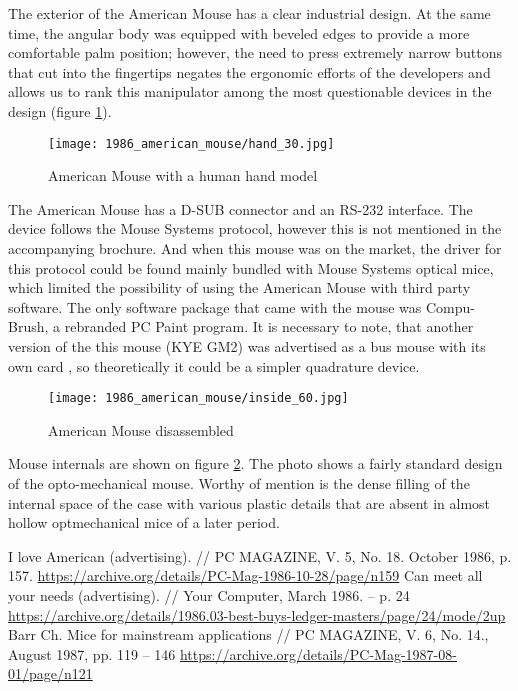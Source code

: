 \documentclass[11pt, a4paper]{article}
\begin{document}
The exterior of the American Mouse has a clear industrial design. At the same time, the angular body was equipped with beveled edges to provide a more comfortable palm position; however, the need to press extremely narrow buttons that cut into the fingertips negates the ergonomic efforts of the developers and allows us to rank this manipulator among the most questionable devices in the design (figure \ref{fig:AmericanHand}).

\begin{figure}[h]
    \centering
    \texttt{[image: 1986\_american\_mouse/hand\_30.jpg]}
    \caption{American Mouse with a human hand model}
    \label{fig:AmericanHand}
\end{figure}

The American Mouse has a D-SUB connector and an RS-232 interface. The device follows the Mouse Systems protocol, however this is not mentioned in the accompanying brochure. And when this mouse was on the market, the driver for this protocol could be found mainly bundled with Mouse Systems optical mice, which limited the possibility of using the American Mouse with third party software. The only software package that came with the mouse was Compu-Brush, a rebranded PC Paint program. It is necessary to note, that another version of the this mouse (KYE GM2) was advertised as a bus mouse with its own card \cite{kye}, so theoretically it could be a simpler quadrature device.

\begin{figure}[h]
    \centering
    \texttt{[image: 1986\_american\_mouse/inside\_60.jpg]}
    \caption{American Mouse disassembled}
    \label{fig:AmericanInside}
\end{figure}

Mouse internals are shown on figure \ref{fig:AmericanInside}. The photo shows a fairly standard design of the opto-mechanical mouse. Worthy of mention is the dense filling of the internal space of the case with various plastic details that are absent in almost hollow optmechanical mice of a later period.

\begin{thebibliography}{9}
 I love American (advertising). // PC MAGAZINE, V. 5, No. 18. October 1986, p. 157. \url{https://archive.org/details/PC-Mag-1986-10-28/page/n159}
 Can meet all your needs (advertising). // Your Computer, March 1986. -- p. 24 \url{https://archive.org/details/1986.03-best-buys-ledger-masters/page/24/mode/2up}
 Barr Ch. Mice for mainstream applications // PC MAGAZINE, V. 6, No. 14., August 1987, pp. 119 – 146 \url{https://archive.org/details/PC-Mag-1987-08-01/page/n121}
\end{thebibliography}
\end{document}
